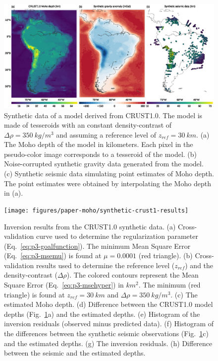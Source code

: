 \begin{figure}
    \centering
    \includegraphics[width=\textwidth]{figures/paper-moho/synthetic-crust1-data}
    \caption{
        Synthetic data of a model derived from CRUST1.0.
        The model is made of tesseroids with an constant density-contrast
        of $\Delta\rho = 350\ kg/m^3$ and assuming a reference level of
        $z_{ref} = 30\ km$.
        (a) The Moho depth of the model in kilometers.
        Each pixel in the pseudo-color image corresponds to a tesseroid of the
        model.
        (b) Noise-corrupted synthetic gravity data generated from the model.
        (c) Synthetic seismic data simulating point estimates of Moho depth.
        The point estimates were obtained by interpolating
        the Moho depth in (a).
    }
    \label{fig:p3-crust1-data}
\end{figure}

\begin{figure}
    \centering
    \texttt{[image: figures/paper-moho/synthetic-crust1-results]}
    \caption{
        Inversion results from the CRUST1.0 synthetic data.
        (a) Cross-validation curve used to determine
        the regularization parameter (Eq.~\ref{eq:p3-goalfunction}).
        The minimum Mean Square Error (Eq.~\ref{eq:p3-msemu}) is found at
        $\mu = 0.0001$ (red triangle).
        (b) Cross-validation results used to determine
        the reference level ($z_{ref}$) and the density-contrast ($\Delta\rho$).
        The colored contours represent
        the Mean Square Error (Eq.~\ref{eq:p3-msehyper}) in $km^2$.
        The minimum (red triangle) is found at $z_{ref} = 30\ km$
        and $\Delta\rho = 350\ kg/m^3$.
        (c) The estimated Moho depth.
        (d) Difference between the CRUST1.0 model depths
        (Fig.~\ref{fig:p3-crust1-data}a)
        and the estimated depths.
        (e) Histogram of the inversion residuals
        (observed minus predicted data).
        (f) Histogram of the differences between
        the synthetic seismic observations (Fig.~\ref{fig:p3-crust1-data}c)
        and the estimated depths.
        (g) The inversion residuals.
        (h) Difference between the seismic and the estimated depths.
    }
    \label{fig:p3-crust1-results}
\end{figure}


